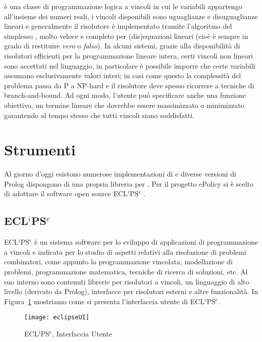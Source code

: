 \clpr è una classe di programmazione logica a vincoli in cui le variabili appartengo all'insieme dei numeri reali, i vincoli disponibili sono uguaglianze e disuguaglianze lineari e generalmente il risolutore è implementato tramite l'algoritmo del simplesso \cite{dantzig51}, molto veloce e completo per (dis)equazioni lineari (cioè è sempre in grado di restituire \emph{vero} o \emph{falso}). In alcuni sistemi, grazie alla disponibilità di risolutori efficienti per la programmazione lineare intera, certi vincoli non lineari sono accettati nel linguaggio, in particolare è possibile imporre che certe variabili assumano esclusivamente valori interi; in casi come questo la complessità del problema passa da P a NP-hard e il risolutore deve spesso ricorrere a tecniche di branch-and-bound. Ad ogni modo, l'utente può specificare anche una funzione obiettivo, un termine lineare che dovrebbe essere massimizzato o minimizzato garantendo al tempo stesso che tutti vincoli siano soddisfatti.


\section{Strumenti}
Al giorno d'oggi esistono numerose implementazioni di \clpr \cite{inclpR} e diverse versioni di Prolog dispongono di una propria libreria per \clpr. Per il progetto ePolicy si è scelto di adottare il software open source  ECL$^i$PS$^e$ \cite{clpEclipse,fromLPtoCLPeclipse}.

\subsection{ECL$^i$PS$^e$}
ECL$^i$PS$^e$ è un sistema software per lo sviluppo di applicazioni di programmazione a vincoli e indicata per lo studio di aspetti relativi alla risoluzione di problemi combinatori, come appunto la programmazione vincolata, modellazione di problemi, programmazione matematica, tecniche di ricerca di soluzioni, etc. Al suo interno sono contenuti librerie per risolutori a vincoli, un linguaggio di alto livello (derivato da Prolog), interfacce per risolutori esterni e altre funzionalità. In Figura~\ref{eclipseUI} mostriamo come si presenta l'interfaccia utente di ECL$^i$PS$^e$.

\begin{figure}[h]
	\centering
	\texttt{[image: eclipseUI]}
	\caption{ECL$^i$PS$^e$, Interfaccia Utente}
	\label{eclipseUI}
\end{figure}

